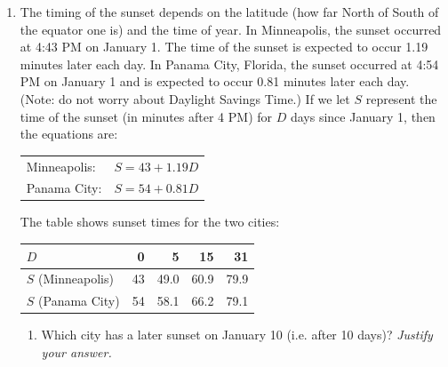 \documentclass[12pt]{article}
\begin{document}
\begin{enumerate}
\newpage %
\item The timing of the sunset depends on the latitude (how far North of South of the equator one is) and the time of year.  In Minneapolis, the sunset occurred at 4:43 PM on January 1.  The time of the sunset is expected to occur 1.19 minutes later each day.  In Panama City, Florida, the sunset occurred at 4:54 PM on January 1 and is expected to occur 0.81 minutes later each day.  (Note: do not worry about Daylight Savings Time.) If we let $S$ represent the time of the sunset (in minutes after 4 PM) for $D$ days since January 1, then the equations are:

\vspace{.1in}

\begin{center}
\begin{tabular} {ll} 
Minneapolis: &$S=43+1.19D$ \\
Panama City: & $S=54+0.81D$ \\
\end{tabular}
\end{center}

The table shows sunset times for the two cities:

\begin{center}
\begin{tabular} {|l|r|r|r|r|} \hline
$D$ & 0 & 5 & 15 & 31 \\ \hline
$S$ (Minneapolis) & 43 &  49.0 & 60.9 & 79.9  \\ \hline
$S$ (Panama City) & 54 & 58.1 & 66.2 & 79.1 \\ \hline
\end{tabular}
\end{center}

\begin{enumerate}

\item Which city has a later sunset on January 10 (i.e. after 10 days)?  \emph{Justify your answer.}
\vfill


\end{enumerate}
\end{enumerate}
\end{document}
